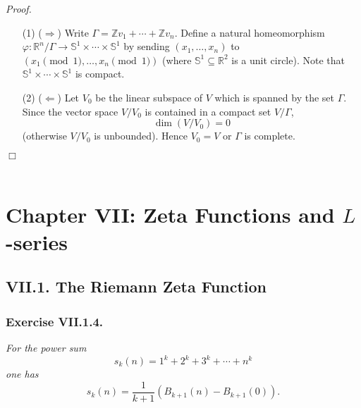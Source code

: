 \documentclass{article}
\begin{document}
\emph{Proof.}
\begin{enumerate}
\item[(1)]
  ($\Longrightarrow$)
  Write $\Gamma = \mathbb{Z} v_1 + \cdots + \mathbb{Z} v_n$.
  Define a natural homeomorphism
  $\varphi: \mathbb{R}^n/\Gamma \to \mathbb{S}^1 \times \cdots \times \mathbb{S}^1$
  by sending $(x_1, \ldots, x_n)$ to $(x_1 \pmod{1}, \ldots, x_n \pmod{1})$
  (where $\mathbb{S}^1 \subseteq \mathbb{R}^2$ is a unit circle).
  Note that $\mathbb{S}^1 \times \cdots \times \mathbb{S}^1$ is compact.

\item[(2)]
  ($\Longleftarrow$)
  Let $V_0$ be the linear subspace of $V$ which is spanned by the set $\Gamma$.
  Since the vector space $V/V_0$ is contained in a compact set $V/\Gamma$,
  \[
    \dim(V/V_0) = 0
  \]
  (otherwise $V/V_0$ is unbounded).
  Hence $V_0 = V$ or $\Gamma$ is complete.
\end{enumerate}
$\Box$ \\\\






\newpage
\section*{Chapter VII: Zeta Functions and $L$-series \\}



\subsection*{VII.1. The Riemann Zeta Function \\}



\subsubsection*{Exercise VII.1.4.}
\emph{For the power sum
\[
  s_k(n) = 1^k + 2^k + 3^k + \cdots + n^k
\]
one has}
\[
  s_k(n) = \frac{1}{k+1} (B_{k+1}(n) - B_{k+1}(0)).
\] \\
\end{document}
